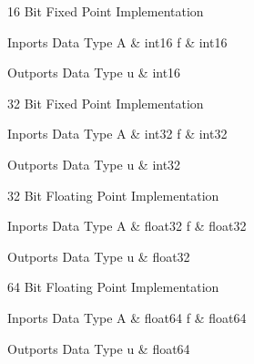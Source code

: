16 Bit Fixed Point Implementation

\begin{XtoCtabular}{Inports Data Type}
A & int16\tabularnewline
\hline
f & int16\tabularnewline
\hline
\end{XtoCtabular}

\begin{XtoCtabular}{Outports Data Type}
u & int16\tabularnewline
\hline
\end{XtoCtabular}

\ifdefined \AddTestReports
{}
\fi
{}
\nopagebreak[0]

32 Bit Fixed Point Implementation

\begin{XtoCtabular}{Inports Data Type}
A & int32\tabularnewline
\hline
f & int32\tabularnewline
\hline
\end{XtoCtabular}

\begin{XtoCtabular}{Outports Data Type}
u & int32\tabularnewline
\hline
\end{XtoCtabular}

\ifdefined \AddTestReports
{}
\fi
{}
\nopagebreak[0]

32 Bit Floating Point Implementation

\begin{XtoCtabular}{Inports Data Type}
A & float32\tabularnewline
\hline
f & float32\tabularnewline
\hline
\end{XtoCtabular}

\begin{XtoCtabular}{Outports Data Type}
u & float32\tabularnewline
\hline
\end{XtoCtabular}

\ifdefined \AddTestReports
{}
\fi
{}
\nopagebreak[0]

64 Bit Floating Point Implementation

\begin{XtoCtabular}{Inports Data Type}
A & float64\tabularnewline
\hline
f & float64\tabularnewline
\hline
\end{XtoCtabular}

\begin{XtoCtabular}{Outports Data Type}
u & float64\tabularnewline
\hline
\end{XtoCtabular}

\ifdefined \AddTestReports
{}
\fi
